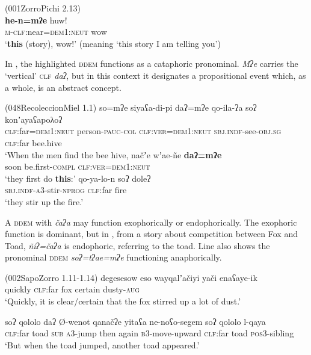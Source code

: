 \documentclass[output=paper,colorlinks,citecolor=brown]{langscibook}
\begin{document}
\ea\label{ex:payne:60} (001ZorroPichi 2.13)\\
\gll  \textbf{he-n=mʔe}  huw!\\
\textsc{m-clf}:near=\textsc{dem1:neut} wow\\
\glt ‘\textbf{this} (story), wow!’ (meaning ‘this story I am telling you’) 
\z

In , the highlighted \textsc{ddem} functions as a cataphoric pronominal. \textit{Mʔe} carries the ‘vertical’ \textsc{clf} \textit{daʔ}, but in this context it designates a propositional event which, as a whole, is an abstract concept.

\ea\label{ex:payne:61} (048RecoleccionMiel 1.1)
\ea\label{ex:payne:61a}
\gll  so=mʔe  siyaʕa-di-pi  daʔ=mʔe qo-ila-ʔa  soʔ  konʼayaʕapoλoʔ\\
 \textsc{clf}:far\textsc{=dem1:neut} person-\textsc{pauc-col} \textsc{clf:ver=dem1:neut} \textsc{sbj.indf}-see-\textsc{obj.sg}  \textsc{clf}:far bee.hive\\
\glt ‘When the men find the bee hive,
\ex\label{ex:payne:61b}
\gll načʼe  wʼae-ñe  \textbf{daʔ=mʔe}\\
 soon be.first-\textsc{compl}  \textsc{clf:ver=dem1:neut}\\
\glt ‘they first do \textbf{this}:’
\ex\label{ex:payne:61c}
\gll qo-ya-lo-n  soʔ  doleʔ\\
  \textsc{sbj.indf-a3}-stir-\textsc{nprog}  \textsc{clf}:far fire\\
\glt ‘they stir up the fire.’ 
\z
\z

A \textsc{ddem} with \textit{čaʔa} may function exophorically or endophorically. The exophoric function is dominant, but in , from a story about competition between Fox and Toad, \textit{ñiʔ=čaʔa} is endophoric, referring to the toad. Line  also shows the pronominal \textsc{ddem} \textit{soʔ=tʔae=mʔe} functioning anaphorically.

\ea\label{ex:payne:62} (002SapoZorro 1.11-1.14)
\ea\label{ex:payne:62a}
\gll degesesow  eso  wayqalʼačiyi  yači  enaʕaye-ik\\
quickly \textsc{clf}:far fox  certain dusty-\textsc{aug}\\
\glt ‘Quickly, it is clear/certain that the fox stirred up a lot of dust.’

\ex\label{ex:payne:62b}
\gll soʔ    qololo  daʔ  Ø-wenot  qanačʔe  yitaʕa ne-noʕo-segem  soʔ  qololo  l-qaya\\
  \textsc{clf}:far toad \textsc{sub}  \textsc{a3}-jump  then  again  \textsc{b3}-move-upward \textsc{clf}:far toad \textsc{pos3}-sibling\\
\glt ‘But when the toad jumped, another toad appeared.’
\end{document}
